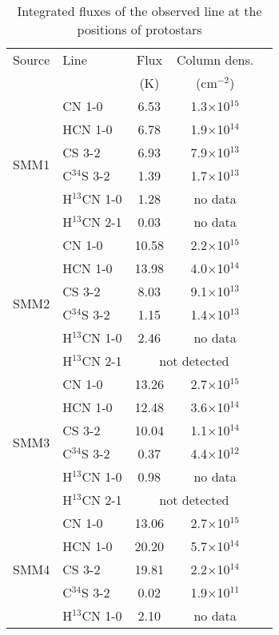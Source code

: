\documentclass{aa}
\begin{document}
\begin{table*}
\caption{Integrated fluxes of the observed line at the positions of protostars}             %
\label{table:4}      %
\centering                          %
\begin{tabular}{c l c c c} 
\hline\hline 
Source & Line & Flux & Column dens. \\
 &  & (K) & (cm$^{-2}$) \\
\hline  
\multirow{6}{*}{SMM1} & CN 1-0 & 6.53 & 1.3$\times$10$^{15}$\\
{} & HCN 1-0 & 6.78 & 1.9$\times$10$^{14}$ \\ 
{} & CS 3-2 & 6.93 & 7.9$\times$10$^{13}$\\  
{} & C$^{34}$S 3-2 & 1.39 & 1.7$\times$10$^{13}$\\ 
{} & H$^{13}$CN 1-0 & 1.28 & no data\\ 
{} & H$^{13}$CN 2-1 & 0.03 & no data\\  \hline
\multirow{6}{*}{SMM2} & CN 1-0 & 10.58 & 2.2$\times$10$^{15}$ \\
{} & HCN 1-0 & 13.98 & 4.0$\times$10$^{14}$\\ 
{} & CS 3-2 & 8.03 & 9.1$\times$10$^{13}$\\  
{} & C$^{34}$S 3-2 & 1.15 & 1.4$\times$10$^{13}$\\
{} & H$^{13}$CN 1-0 & 2.46 & no data\\ 
{} & H$^{13}$CN 2-1 & \multicolumn{2}{c}{not detected}  \\  \hline
\multirow{6}{*}{SMM3} & CN 1-0 & 13.26 & 2.7$\times$10$^{15}$\\
{} & HCN 1-0 & 12.48 & 3.6$\times$10$^{14}$\\ 
{} & CS 3-2 & 10.04 & 1.1$\times$10$^{14}$\\  
{} & C$^{34}$S 3-2 & 0.37 & 4.4$\times$10$^{12}$\\
{} & H$^{13}$CN 1-0 & 0.98 & no data\\ 
{} & H$^{13}$CN 2-1 & \multicolumn{2}{c}{not detected}  \\  \hline
\multirow{6}{*}{SMM4} & CN 1-0 & 13.06 & 2.7$\times$10$^{15}$\\
{} & HCN 1-0 & 20.20 & 5.7$\times$10$^{14}$ \\ 
{} & CS 3-2 & 19.81 & 2.2$\times$10$^{14}$\\  
{} & C$^{34}$S 3-2 & 0.02 & 1.9$\times$10$^{11}$\\ 
{} & H$^{13}$CN 1-0 & 2.10 & no data\\ 

\end{tabular}
\end{table*}
\end{document}
